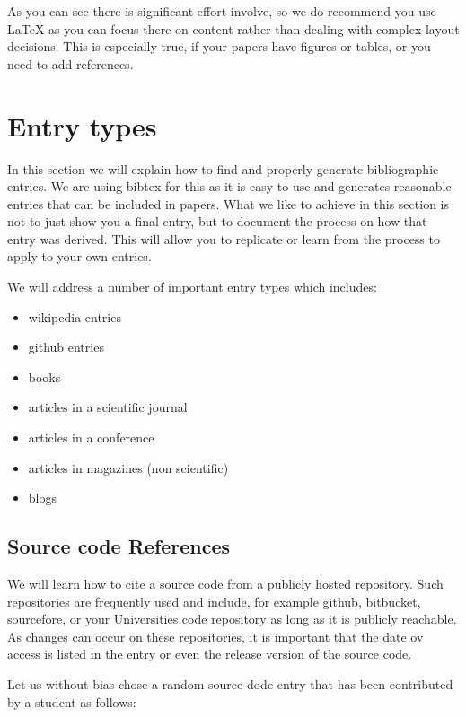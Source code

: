 As you can see there is significant effort involve, so we do recommend
you use LaTeX as you can focus there on content rather than dealing with
complex layout decisions. This is especially true, if your papers have
figures or tables, or you need to add references.


\section{Entry types}

In this section we will explain how to find and properly generate
bibliographic entries. We are using bibtex for this as it is easy to use
and generates reasonable entries that can be included in papers. What we
like to achieve in this section is not to just show you a final entry,
but to document the process on how that entry was derived. This will
allow you to replicate or learn from the process to apply to your own
entries.

We will address a number of important entry types which includes:

\begin{itemize}
\tightlist
\item
  wikipedia entries
\item
  github entries
\item
  books
\item
  articles in a scientific journal
\item
  articles in a conference
\item
  articles in magazines (non scientific)
\item
  blogs
\end{itemize}

\subsection{Source code References}\label{source-code-references}

We will learn how to cite a source code from a publicly hosted
repository. Such repositories are frequently used and include, for
example github, bitbucket, sourcefore, or your Universities code
repository as long as it is publicly reachable. As changes can occur on
these repositories, it is important that the date ov access is listed in
the entry or even the release version of the source code.

Let us without bias chose a random source dode entry that has been
contributed by a student as follows:


